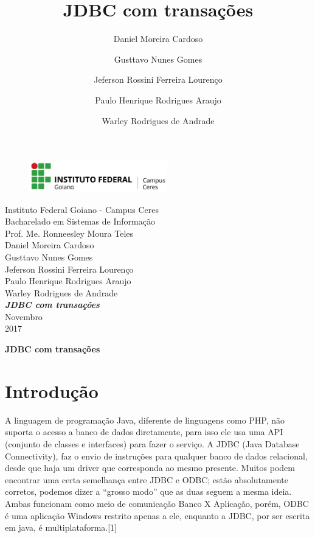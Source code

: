 \documentclass[12pt,a4paper]{article}
\title{JDBC com transações}
\author{Daniel Moreira Cardoso \and Gusttavo Nunes Gomes\and Jeferson Rossini Ferreira Lourenço\and Paulo Henrique Rodrigues Araujo\and Warley Rodrigues de Andrade}
\begin{document}
\begin{titlepage}
\begin{center}
\begin{figure}[htb]
                
                \label{figura:LogoIF}
        
                \centering
                \includegraphics[width=6cm]{recursos/imagens/logo.png} 
\end{figure}
Instituto Federal Goiano - Campus Ceres\\
Bacharelado em Sistemas de Informação\\
Prof. Me. Ronneesley Moura Teles\\\vspace{1cm}
Daniel Moreira Cardoso \\
Gusttavo Nunes Gomes\\
Jeferson Rossini Ferreira Lourenço\\
Paulo Henrique Rodrigues Araujo\\
Warley Rodrigues de Andrade\\
\vspace{6.0cm}
\textit{\textbf{\Large{JDBC com transações}}}\\\vspace{11cm}
Novembro\\
2017\\
\end{center}
\end{titlepage}
\tableofcontents
\newpage
\begin{center}
\textbf{\Large{JDBC com transações}}\\\vspace{0.5cm}
\end{center}
\section{Introdução}
A linguagem de programação Java, diferente de linguagens como PHP, não suporta o acesso a banco de dados diretamente, para isso ele usa uma API (conjunto de classes e interfaces) para fazer o serviço. A JDBC (Java Database Connectivity), faz o envio de instruções para qualquer banco de dados relacional, desde que haja um driver que corresponda ao mesmo presente. 
Muitos podem encontrar uma certa semelhança entre JDBC e ODBC; estão absolutamente corretos, podemos dizer a “grosso modo” que as duas seguem a mesma ideia. Ambas funcionam como meio de comunicação Banco X Aplicação, porém, ODBC é uma aplicação Windows restrito apenas a ele, enquanto a JDBC, por ser escrita em java, é multiplataforma.[1]
\end{document}
